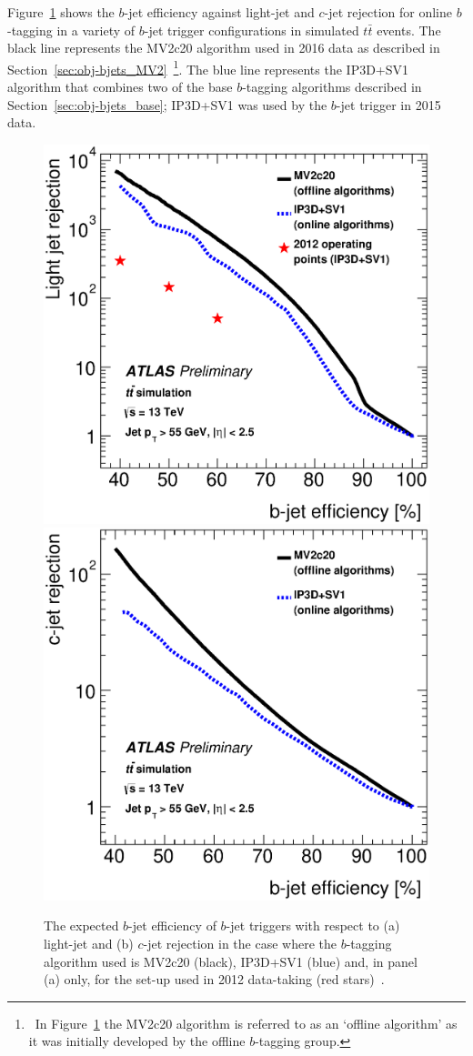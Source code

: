 Figure~\ref{fig:trig-bTrig_perf} shows the $b$-jet efficiency against light-jet and $c$-jet rejection
for online $b$-tagging in a variety of $b$-jet trigger configurations in simulated $t\bar{t}$ events.
The black line represents the MV2c20 algorithm used in 2016 data as described in Section~\ref{sec:obj-bjets_MV2}~\footnote{\ In
  Figure~\ref{fig:trig-bTrig_perf} the MV2c20 algorithm is referred to as an `offline algorithm' as it was initially developed by the offline $b$-tagging group.}.
The blue line represents the IP3D+SV1 algorithm that combines two of the base $b$-tagging algorithms described in Section~\ref{sec:obj-bjets_base};
IP3D+SV1 was used by the $b$-jet trigger in 2015 data.

\begin{figure}[!ht]
  \begin{center}
    \includegraphics[width=0.48\linewidth, angle=0]{figs/Trigger/trig-bTrig_perf_light.eps}
    \includegraphics[width=0.48\linewidth, angle=0]{figs/Trigger/trig-bTrig_perf_charm.eps}
  \end{center}
  \vspace{-1em}
  \caption[The expected $b$-jet efficiency of $b$-jet triggers in Run-2 compared to the set-up used in 2012 data-taking.]
    {The expected $b$-jet efficiency of $b$-jet triggers with respect to (a) light-jet and (b) $c$-jet rejection
    in the case where the $b$-tagging algorithm used is MV2c20 (black), IP3D+SV1 (blue) and, in panel (a) only, for the set-up used in 2012 data-taking (red stars)~\cite{trig-bTrig_desc}.}
  \label{fig:trig-bTrig_perf}
\end{figure}

